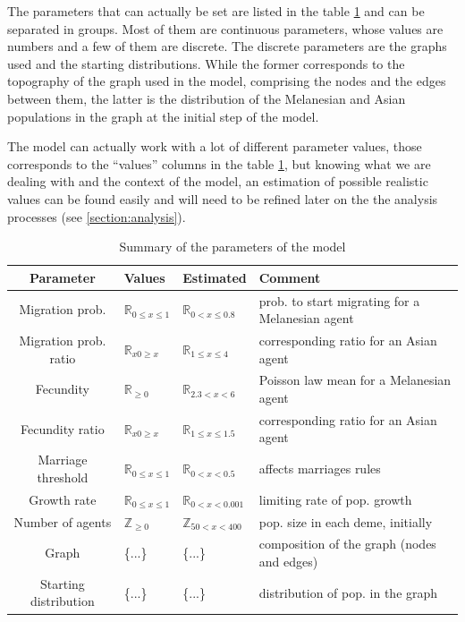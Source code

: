 \documentclass[a4paper,12pt]{report}
\begin{document}
The parameters that can actually be set are listed in the table \ref{parameters} and can be separated in groups. Most of them are continuous parameters, whose values are numbers and a few of them are discrete. The discrete parameters are the graphs used and the starting distributions. While the former corresponds to the topography of the graph used in the model, comprising the nodes and the edges between them, the latter is the distribution of the Melanesian and Asian populations in the graph at the initial step of the model.

The model can actually work with a lot of different parameter values, those corresponds to the “values” columns in the table \ref{parameters}, but knowing what we are dealing with and the context of the model, an estimation of possible realistic values can be found easily and will need to be refined later on the the analysis processes (see \ref{section:analysis}).

\begin{table}
	\hspace*{-1cm}
	\begin{tabular}{|c|l|l|l|}
		\hline
 		Parameter & Values & Estimated & Comment \\ \hline
        Migration prob. & $\mathbb{R}_{0 \leq x \leq 1}$ & $\mathbb{R}_{0 < x \leq 0.8}$ & prob. to start migrating for a Melanesian agent \\ \hline
        Migration prob. ratio & $\mathbb{R}_{x 0 \geq x}$ & $\mathbb{R}_{1 \leq x \leq 4}$ & corresponding ratio for an Asian agent \\ \hline
        Fecundity & $\mathbb{R}_{\geq 0}$ & $\mathbb{R}_{2.3 < x < 6}$ & Poisson law mean for a Melanesian agent \\ \hline
        Fecundity ratio & $\mathbb{R}_{x 0 \geq x}$ & $\mathbb{R}_{1 \leq x \leq 1.5}$ & corresponding ratio for an Asian agent \\ \hline
        Marriage threshold & $\mathbb{R}_{0 \leq x \leq 1}$ & $\mathbb{R}_{0 < x < 0.5}$ & affects marriages rules \\ \hline
        Growth rate & $\mathbb{R}_{0 \leq x \leq 1}$ & $\mathbb{R}_{0 < x < 0.001}$ & limiting rate of pop. growth \\ \hline
        Number of agents & $\mathbb{Z}_{\geq 0}$ & $\mathbb{Z}_{50 < x < 400}$ & pop. size in each deme, initially \\ \hline
        Graph & \{...\} & \{...\} & composition of the graph (nodes and edges) \\ \hline
        Starting distribution & \{...\} & \{...\} & distribution of pop. in the graph \\ \hline
	\end{tabular}
	\caption{Summary of the parameters of the model}
	\label{parameters}
\end{table}
\end{document}
